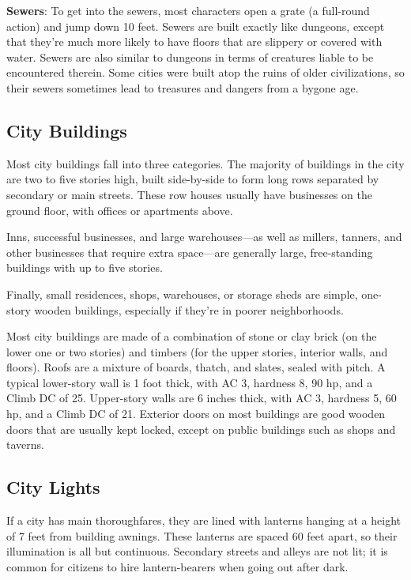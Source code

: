 \textbf{Sewers}: To get into the sewers, most characters open a grate (a full-round action) and jump down 10 feet. Sewers are built exactly like dungeons, except that they're much more likely to have floors that are slippery or covered with water. Sewers are also similar to dungeons in terms of creatures liable to be encountered therein. Some cities were built atop the ruins of older civilizations, so their sewers sometimes lead to treasures and dangers from a bygone age.
				
\subsection{City Buildings}

				
Most city buildings fall into three categories. The majority of buildings in the city are two to five stories high, built side-by-side to form long rows separated by secondary or main streets. These row houses usually have businesses on the ground floor, with offices or apartments above.
				
Inns, successful businesses, and large warehouses---as well as millers, tanners, and other businesses that require extra space---are generally large, free-standing buildings with up to five stories. 
				
Finally, small residences, shops, warehouses, or storage sheds are simple, one-story wooden buildings, especially if they're in poorer neighborhoods.
				
Most city buildings are made of a combination of stone or clay brick (on the lower one or two stories) and timbers (for the upper stories, interior walls, and floors). Roofs are a mixture of boards, thatch, and slates, sealed with pitch. A typical lower-story wall is 1 foot thick, with AC 3, hardness 8, 90 hp, and a Climb DC of 25. Upper-story walls are 6 inches thick, with AC 3, hardness 5, 60 hp, and a Climb DC of 21. Exterior doors on most buildings are good wooden doors that are usually kept locked, except on public buildings such as shops and taverns.
				
\subsection{City Lights}

				
If a city has main thoroughfares, they are lined with lanterns hanging at a height of 7 feet from building awnings. These lanterns are spaced 60 feet apart, so their illumination is all but continuous. Secondary streets and alleys are not lit; it is common for citizens to hire lantern-bearers when going out after dark.
				
